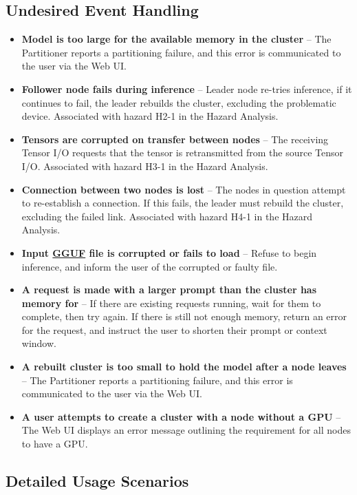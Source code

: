 \documentclass[12pt]{article}
\begin{document}
\subsection{Undesired Event Handling}\label{subsec:undesired-event-handling}
\begin{itemize}
    \item \textbf{Model is too large for the available memory in the cluster} --
		The Partitioner reports a partitioning failure, and this error is communicated to the
		user via the Web UI.
	\item \textbf{Follower node fails during inference} -- Leader node re-tries inference,
		if it continues to fail, the leader rebuilds the cluster, excluding the problematic device.
		Associated with hazard H2-1 in the Hazard Analysis.
	\item \textbf{Tensors are corrupted on transfer between nodes} -- The receiving Tensor I/O
		requests that the tensor is retransmitted from the source Tensor I/O.
		Associated with hazard H3-1 in the Hazard Analysis.
	\item \textbf{Connection between two nodes is lost} -- The nodes in question attempt to
		re-establish a connection. If this fails, the leader must rebuild the cluster, excluding
		the failed link. Associated with hazard H4-1 in the Hazard Analysis.
	\item \textbf{Input \href{https://github.com/ggml-org/ggml/blob/master/docs/gguf.md}{GGUF}
		file is corrupted or fails to load} --
		Refuse to begin inference, and inform the user of the corrupted or faulty file.
	\item \textbf{A request is made with a larger prompt than the cluster has memory for} --
		If there are existing requests running, wait for them to complete, then try again.
		If there is still not enough memory, return an error for the request, and instruct the user
		to shorten their prompt or context window.
	\item \textbf{A rebuilt cluster is too small to hold the model after a node leaves} --
		The Partitioner reports a partitioning failure, and this error is communicated to the
		user via the Web UI.
	\item \textbf{A user attempts to create a cluster with a node without a GPU} --
		The Web UI displays an error message outlining the requirement for all nodes to have a GPU.
\end{itemize}

\subsection{Detailed Usage Scenarios}\label{subsec:detailed-usage-scenarios}
\end{document}
